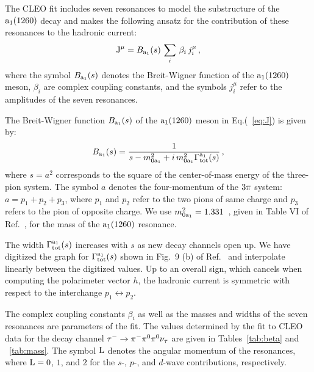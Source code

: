 The CLEO fit includes seven resonances to model the substructure of the $\textrm{a}_{1}\textrm{(1260)}$ decay and makes the following ansatz for the contribution of these resonances to the hadronic current:
\begin{equation}
\textrm{J}^{\mu} = B_{\textrm{a}_{1}}(s) \, \sum_{i} \, \beta_{i} \, j_{i}^{\mu} \, ,
\label{eq:J}
\end{equation}
where the symbol $B_{\textrm{a}_{1}}(s)$ denotes the Breit-Wigner function of the $\textrm{a}_{1}\textrm{(1260)}$ meson, $\beta_{i}$ are complex coupling constants, and the symbols $j_{i}^{\mu}$ refer to the amplitudes of the seven resonances.

The Breit-Wigner function $B_{\textrm{a}_{1}}(s)$ of the $\textrm{a}_{1}\textrm{(1260)}$ meson in Eq.(~\ref{eq:J}) is given by:
\begin{equation}
B_{\textrm{a}_{1}}(s) = \frac{1}{s - m_{0\textrm{a}_{1}}^{2} + i \, m_{0\textrm{a}_{1}}^{2} \Gamma_{\textrm{tot}}^{\textrm{a}_{1}}(s)} \, ,
\label{eq:Ba1}
\end{equation}
where $s = a^{2}$ corresponds to the square of the center-of-mass energy of the three-pion system.
The symbol $a$ denotes the four-momentum of the $3 \pi$ system: $a = p_{1} + p_{2} + p_{3}$,
where $p_{1}$ and $p_{2}$ refer to the two pions of same charge and $p_{3}$ refers to the pion of opposite charge.
We use $m_{0\textrm{a}_{1}}^{2} = 1.331$~\GeV, given in Table VI of Ref.~\cite{CLEO:1999rzk}, for the mass of the $\textrm{a}_{1}\textrm{(1260)}$ resonance.

The width $\Gamma_{\textrm{tot}}^{\textrm{a}_{1}}(s)$ increases with $s$ as new decay channels open up.
We have digitized the graph for $\Gamma_{\textrm{tot}}^{\textrm{a}_{1}}(s)$ shown in Fig.~9 (b) of Ref.~\cite{CLEO:1999rzk} and interpolate linearly between the digitized values.
Up to an overall sign, which cancels when computing the polarimeter vector $h$, the hadronic current is symmetric with respect to the interchange $p_{1} \leftrightarrow p_{2}$.

The complex coupling constants $\beta_{i}$ as well as the masses and widths of the seven resonances are parameters of the fit.
The values determined by the fit to CLEO data for the decay channel $\tau^{-} \to \pi^{-}\pi^{\textrm{0}}\pi^{\textrm{0}}\nu_{\tau}$ are given in Tables~\ref{tab:beta} and ~\ref{tab:mass}.
The symbol $\textrm{L}$ denotes the angular momentum of the resonances, where $\textrm{L}=0$, $1$, and $2$ for the $s$-, $p$-, and $d$-wave contributions, respectively.

